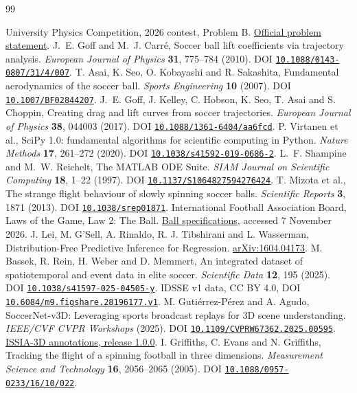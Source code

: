 \documentclass[11pt,letterpaper]{article}
\newcommand{\doi}[1]{\href{https://doi.org/#1}{\nolinkurl{#1}}}
\begin{document}
\begin{thebibliography}{99}\small
{}
\setlength{\itemsep}{4pt}
University Physics Competition, 2026 contest, Problem B.
\href{https://uphysicsc.com/2026contest.html}{Official problem statement}.
J.~E. Goff and M.~J. Carr\'e, Soccer ball lift coefficients via trajectory analysis.
\emph{European Journal of Physics} \textbf{31}, 775--784 (2010).
DOI \doi{10.1088/0143-0807/31/4/007}.
T. Asai, K. Seo, O. Kobayashi and R. Sakashita, Fundamental aerodynamics of the soccer ball.
\emph{Sports Engineering} \textbf{10} (2007). DOI \doi{10.1007/BF02844207}.
J.~E. Goff, J. Kelley, C. Hobson, K. Seo, T. Asai and S. Choppin,
Creating drag and lift curves from soccer trajectories.
\emph{European Journal of Physics} \textbf{38}, 044003 (2017).
DOI \doi{10.1088/1361-6404/aa6fcd}.
P. Virtanen et al., SciPy 1.0: fundamental algorithms for scientific computing in Python.
\emph{Nature Methods} \textbf{17}, 261--272 (2020).
DOI \doi{10.1038/s41592-019-0686-2}.
L.~F. Shampine and M.~W. Reichelt, The MATLAB ODE Suite.
\emph{SIAM Journal on Scientific Computing} \textbf{18}, 1--22 (1997).
DOI \doi{10.1137/S1064827594276424}.
T. Mizota et al., The strange flight behaviour of slowly spinning soccer balls.
\emph{Scientific Reports} \textbf{3}, 1871 (2013).
DOI \doi{10.1038/srep01871}.
International Football Association Board, Laws of the Game, Law 2: The Ball.
\href{https://www.theifab.com/laws/latest/the-ball/}{Ball specifications}, accessed 7 November 2026.
J. Lei, M. G'Sell, A. Rinaldo, R. J. Tibshirani and L. Wasserman,
Distribution-Free Predictive Inference for Regression.
\href{https://arxiv.org/abs/1604.04173}{arXiv:1604.04173}.
M. Bassek, R. Rein, H. Weber and D. Memmert, An integrated dataset of spatiotemporal and event data in elite soccer.
\emph{Scientific Data} \textbf{12}, 195 (2025).
DOI \doi{10.1038/s41597-025-04505-y}. IDSSE v1 data, CC BY 4.0,
DOI \doi{10.6084/m9.figshare.28196177.v1}.
M. Guti\'errez-P\'erez and A. Agudo, SoccerNet-v3D: Leveraging sports broadcast replays for 3D scene understanding.
\emph{IEEE/CVF CVPR Workshops} (2025). DOI \doi{10.1109/CVPRW67362.2025.00595}.
\href{https://github.com/mguti97/SoccerNet-v3D/releases/tag/v1.0.0}{ISSIA-3D annotations, release 1.0.0}.
I. Griffiths, C. Evans and N. Griffiths, Tracking the flight of a spinning football in three dimensions.
\emph{Measurement Science and Technology} \textbf{16}, 2056--2065 (2005).
DOI \doi{10.1088/0957-0233/16/10/022}.
\end{thebibliography}
\end{document}
